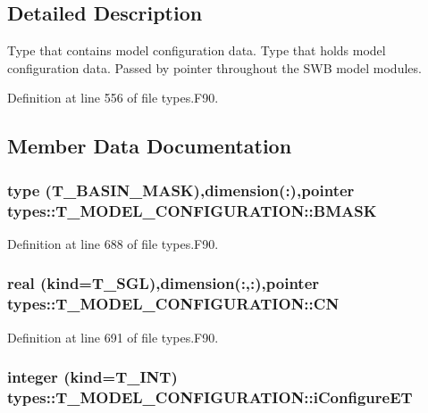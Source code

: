 \subsection{Detailed Description}
Type that contains model configuration data. Type that holds model configuration data. Passed by pointer throughout the SWB model modules. 

Definition at line 556 of file types.F90.



\subsection{Member Data Documentation}
\hypertarget{typetypes_1_1_t___m_o_d_e_l___c_o_n_f_i_g_u_r_a_t_i_o_n_a3cb15ee5ca40b3d75222b97deb0b740a}{
\subsubsection[{BMASK}]{\setlength{\rightskip}{0pt plus 5cm}type ({\bf T\_\-BASIN\_\-MASK}),dimension(:),pointer {\bf types::T\_\-MODEL\_\-CONFIGURATION::BMASK}}}
\label{typetypes_1_1_t___m_o_d_e_l___c_o_n_f_i_g_u_r_a_t_i_o_n_a3cb15ee5ca40b3d75222b97deb0b740a}


Definition at line 688 of file types.F90.

\hypertarget{typetypes_1_1_t___m_o_d_e_l___c_o_n_f_i_g_u_r_a_t_i_o_n_ae23f5600c8963f0a3c6a44d769390353}{
\subsubsection[{CN}]{\setlength{\rightskip}{0pt plus 5cm}real (kind={\bf T\_\-SGL}),dimension(:,:),pointer {\bf types::T\_\-MODEL\_\-CONFIGURATION::CN}}}
\label{typetypes_1_1_t___m_o_d_e_l___c_o_n_f_i_g_u_r_a_t_i_o_n_ae23f5600c8963f0a3c6a44d769390353}


Definition at line 691 of file types.F90.

\hypertarget{typetypes_1_1_t___m_o_d_e_l___c_o_n_f_i_g_u_r_a_t_i_o_n_acb5433d1af15247b5bae06192232a15e}{
\subsubsection[{iConfigureET}]{\setlength{\rightskip}{0pt plus 5cm}integer (kind={\bf T\_\-INT}) {\bf types::T\_\-MODEL\_\-CONFIGURATION::iConfigureET}}}
\label{typetypes_1_1_t___m_o_d_e_l___c_o_n_f_i_g_u_r_a_t_i_o_n_acb5433d1af15247b5bae06192232a15e}


